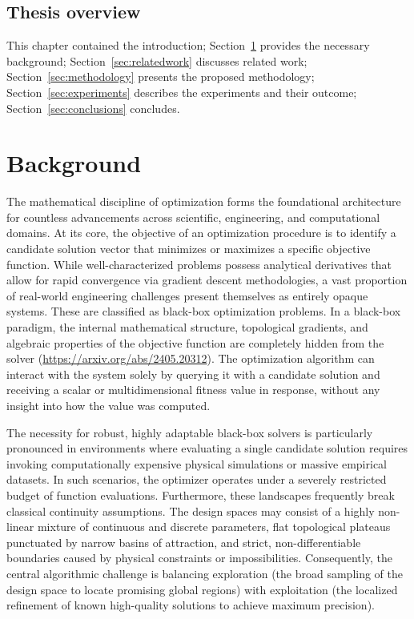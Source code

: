\documentclass[12pt]{article}
\begin{document}
\subsection{Thesis overview}
This chapter contained the introduction; Section~\ref{sec:background} provides the necessary background; Section~\ref{sec:relatedwork} discusses related work; Section~\ref{sec:methodology} presents the proposed methodology; Section~\ref{sec:experiments} describes the experiments and their outcome; Section~\ref{sec:conclusions} concludes. 


\section{Background}\label{sec:background}

The mathematical discipline of optimization forms the foundational architecture for countless advancements across scientific, engineering, and computational domains. At its core, the objective of an optimization procedure is to identify a candidate solution vector that minimizes or maximizes a specific objective function. While well-characterized problems possess analytical derivatives that allow for rapid convergence via gradient descent methodologies, a vast proportion of real-world engineering challenges present themselves as entirely opaque systems. These are classified as black-box optimization problems. In a black-box paradigm, the internal mathematical structure, topological gradients, and algebraic properties of the objective function are completely hidden from the solver (\url{https://arxiv.org/abs/2405.20312}). The optimization algorithm can interact with the system solely by querying it with a candidate solution and receiving a scalar or multidimensional fitness value in response, without any insight into how the value was computed.

The necessity for robust, highly adaptable black-box solvers is particularly pronounced in environments where evaluating a single candidate solution requires invoking computationally expensive physical simulations or massive empirical datasets. In such scenarios, the optimizer operates under a severely restricted budget of function evaluations. Furthermore, these landscapes frequently break classical continuity assumptions. The design spaces may consist of a highly non-linear mixture of continuous and discrete parameters, flat topological plateaus punctuated by narrow basins of attraction, and strict, non-differentiable boundaries caused by physical constraints or impossibilities. Consequently, the central algorithmic challenge is balancing exploration (the broad sampling of the design space to locate promising global regions) with exploitation (the localized refinement of known high-quality solutions to achieve maximum precision).
\end{document}
